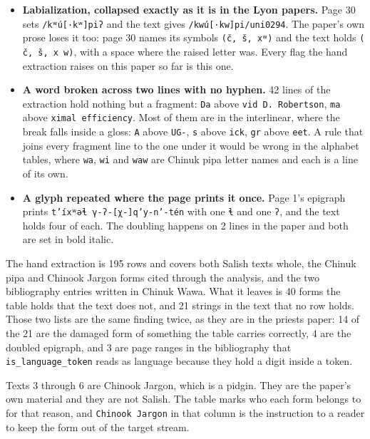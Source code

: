 \begin{itemize}
\item \textbf{Labialization, collapsed exactly as it is in the Lyon papers.} Page 30 sets \texttt{/\allowbreak{}kʷú[·kʷ]piʔ} and the text gives \texttt{/\allowbreak{}kwú[·kw]pi/\allowbreak{}uni0294}. The paper's own prose loses it too: page 30 names its symbols \texttt{(č, š, xʷ)} and the text holds \texttt{( č, š, x w)}, with a space where the raised letter was. Every flag the hand extraction raises on this paper so far is this one.
\item \textbf{A word broken across two lines with no hyphen.} 42 lines of the extraction hold nothing but a fragment: \texttt{Da} above \texttt{vid D.\allowbreak{} Robertson}, \texttt{ma} above \texttt{ximal efficiency}. Most of them are in the interlinear, where the break falls inside a gloss: \texttt{A} above \texttt{UG-\allowbreak{}}, \texttt{s} above \texttt{ick}, \texttt{gr} above \texttt{eet}. A rule that joins every fragment line to the one under it would be wrong in the alphabet tables, where \texttt{wa}, \texttt{wi} and \texttt{waw} are Chinuk pipa letter names and each is a line of its own.
\item \textbf{A glyph repeated where the page prints it once.} Page 1's epigraph prints \texttt{t’íxʷəɬ γ-\allowbreak{}ʔ-\allowbreak{}[χ-\allowbreak{}]q’y-\allowbreak{}n’-\allowbreak{}tén} with one \texttt{ɬ} and one \texttt{ʔ}, and the text holds four of each. The doubling happens on 2 lines in the paper and both are set in bold italic.
\end{itemize}

The hand extraction is 195 rows and covers both Salish texts whole, the Chinuk pipa and Chinook Jargon forms cited through the analysis, and the two bibliography entries written in Chinuk Wawa. What it leaves is 40 forms the table holds that the text does not, and 21 strings in the text that no row holds. Those two lists are the same finding twice, as they are in the priests paper: 14 of the 21 are the damaged form of something the table carries correctly, 4 are the doubled epigraph, and 3 are page ranges in the bibliography that \texttt{is\_\allowbreak{}language\_\allowbreak{}token} reads as language because they hold a digit inside a token.

Texts 3 through 6 are Chinook Jargon, which is a pidgin. They are the paper's own material and they are not Salish. The table marks who each form belongs to for that reason, and \texttt{Chinook Jargon} in that column is the instruction to a reader to keep the form out of the target stream.

